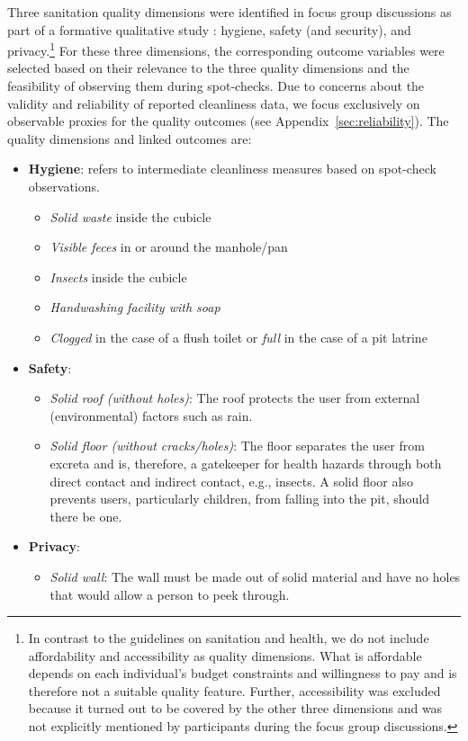 \documentclass[natbib]{svjour3}                     %
\begin{document}
Three sanitation quality dimensions were identified in focus group discussions as part of a formative qualitative study \citep{Schelbert2020}: hygiene, safety (and security), and privacy.\footnote{In contrast to the \cite{WHO2018} guidelines on sanitation and health, we do not include affordability and accessibility as quality dimensions. What is affordable depends on each individual's budget constraints and willingness to pay and is therefore not a suitable quality feature. Further, accessibility was excluded because it turned out to be covered by the other three dimensions and was not explicitly mentioned by participants during the focus group discussions.} For these three dimensions, the corresponding outcome variables were selected based on their relevance to the three quality dimensions and the feasibility of observing them during spot-checks. Due to concerns about the validity and reliability of reported cleanliness data, we focus exclusively on observable proxies for the quality outcomes (see Appendix~\ref{sec:reliability}). The quality dimensions and linked outcomes are:
\begin{itemize}
\item \textbf{Hygiene}: refers to intermediate cleanliness measures based on spot-check observations.
\begin{itemize}
    \item \textit{Solid waste} inside the cubicle
    \item \textit{Visible feces} in or around the manhole/pan
    \item \textit{Insects} inside the cubicle
    \item \emph{Handwashing facility \emph{with} soap}
    \item \textit{Clogged} in the case of a flush toilet or \textit{full} in the case of a pit latrine
\end{itemize}
\item \textbf{Safety}:
\begin{itemize}
    \item \textit{Solid roof (without holes)}: The roof protects the user from external (environmental) factors such as rain.
    \item \textit{Solid floor (without cracks/holes)}: The floor separates the user from excreta and is, therefore, a gatekeeper for health hazards through both direct contact and indirect contact, e.g., insects. A solid floor also prevents users, particularly children, from falling into the pit, should there be one. 
\end{itemize}
\item \textbf{Privacy}:
\begin{itemize}
    \item \textit{Solid wall}: The wall must be made out of solid material and have no holes that would allow a person to peek through.
\end{itemize}
\end{itemize}
\end{document}
